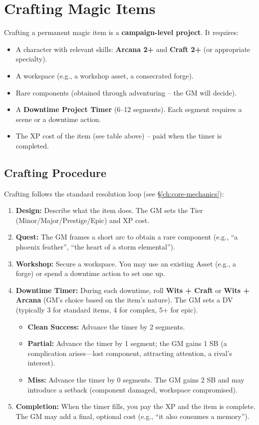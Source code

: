 \section{Crafting Magic Items}
\label{sec:crafting}

Crafting a permanent magic item is a \textbf{campaign-level project}. It requires:
\begin{itemize}
  \item A character with relevant skills: \textbf{Arcana 2+} and \textbf{Craft 2+} (or appropriate specialty).
  \item A workspace (e.g., a workshop asset, a consecrated forge).
  \item Rare components (obtained through adventuring -- the GM will decide).
  \item A \textbf{Downtime Project Timer} (6--12 segments). Each segment requires a scene or a downtime action.
  \item The XP cost of the item (see table above) -- paid when the timer is completed.
\end{itemize}

\subsection{Crafting Procedure}
\label{subsec:crafting-procedure}

Crafting follows the standard resolution loop (see \S\ref{ch:core-mechanics}):

\begin{enumerate}
  \item \textbf{Design:} Describe what the item does. The GM sets the Tier (Minor/Major/Prestige/Epic) and XP cost.
  \item \textbf{Quest:} The GM frames a short arc to obtain a rare component (e.g., ``a phoenix feather'', ``the heart of a storm elemental'').
  \item \textbf{Workshop:} Secure a workspace. You may use an existing Asset (e.g., a forge) or spend a downtime action to set one up.
  \item \textbf{Downtime Timer:} During each downtime, roll \textbf{Wits + Craft} or \textbf{Wits + Arcana} (GM's choice based on the item's nature). The GM sets a DV (typically 3 for standard items, 4 for complex, 5+ for epic).
  \begin{itemize}
    \item \textbf{Clean Success:} Advance the timer by 2 segments.
    \item \textbf{Partial:} Advance the timer by 1 segment; the GM gains 1 SB (a complication arises---lost component, attracting attention, a rival's interest).
    \item \textbf{Miss:} Advance the timer by 0 segments. The GM gains 2 SB and may introduce a setback (component damaged, workspace compromised).
  \end{itemize}
  \item \textbf{Completion:} When the timer fills, you pay the XP and the item is complete. The GM may add a final, optional cost (e.g., ``it also consumes a memory'').
\end{enumerate}

